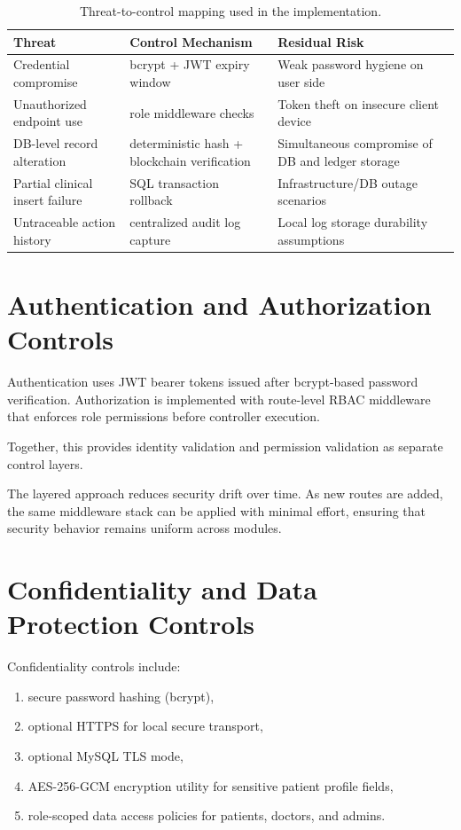 \documentclass[12pt,a4paper]{report}
\begin{document}
\begin{table}[htbp]
\centering
\caption{Threat-to-control mapping used in the implementation.}
\label{tab:threat-control-map}
\begin{tabular}{p{} p{} p{}}
\toprule
\textbf{Threat} & \textbf{Control Mechanism} & \textbf{Residual Risk} \\
\midrule
Credential compromise & bcrypt + JWT expiry window & Weak password hygiene on user side \\
Unauthorized endpoint use & role middleware checks & Token theft on insecure client device \\
DB-level record alteration & deterministic hash + blockchain verification & Simultaneous compromise of DB and ledger storage \\
Partial clinical insert failure & SQL transaction rollback & Infrastructure/DB outage scenarios \\
Untraceable action history & centralized audit log capture & Local log storage durability assumptions \\
\bottomrule
\end{tabular}
\end{table}

\section{Authentication and Authorization Controls}

Authentication uses JWT bearer tokens issued after bcrypt-based password verification. Authorization is implemented with route-level RBAC middleware that enforces role permissions before controller execution.

Together, this provides identity validation and permission validation as separate control layers.

The layered approach reduces security drift over time. As new routes are added, the same middleware stack can be applied with minimal effort, ensuring that security behavior remains uniform across modules.

\section{Confidentiality and Data Protection Controls}

Confidentiality controls include:

\begin{enumerate}
\item secure password hashing (bcrypt),
\item optional HTTPS for local secure transport,
\item optional MySQL TLS mode,
\item AES-256-GCM encryption utility for sensitive patient profile fields,
\item role-scoped data access policies for patients, doctors, and admins.
\end{enumerate}
\end{document}
